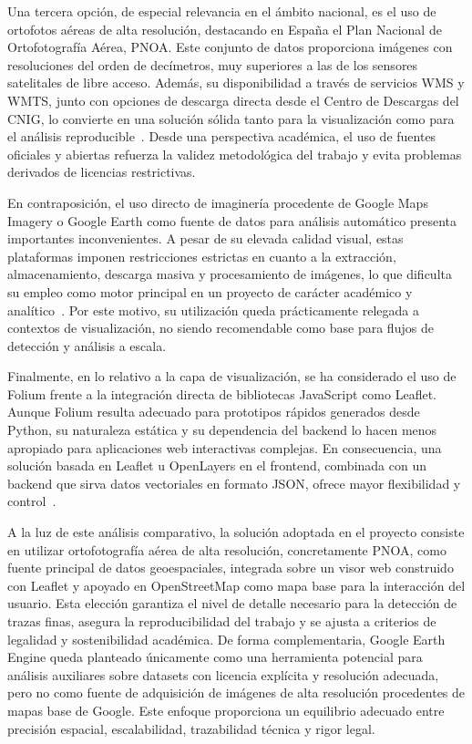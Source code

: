 Una tercera opción, de especial relevancia en el ámbito nacional, es el uso de ortofotos aéreas de alta resolución, destacando en España el Plan Nacional de Ortofotografía Aérea, PNOA. Este conjunto de datos proporciona imágenes con resoluciones del orden de decímetros, muy superiores a las de los sensores satelitales de libre acceso. Además, su disponibilidad a través de servicios WMS y WMTS, junto con opciones de descarga directa desde el Centro de Descargas del CNIG, lo convierte en una solución sólida tanto para la visualización como para el análisis reproducible~\cite{pnoa_ign, cnig_pnoa_maxima_actualidad}. Desde una perspectiva académica, el uso de fuentes oficiales y abiertas refuerza la validez metodológica del trabajo y evita problemas derivados de licencias restrictivas.

En contraposición, el uso directo de imaginería procedente de Google Maps Imagery o Google Earth como fuente de datos para análisis automático presenta importantes inconvenientes. A pesar de su elevada calidad visual, estas plataformas imponen restricciones estrictas en cuanto a la extracción, almacenamiento, descarga masiva y procesamiento de imágenes, lo que dificulta su empleo como motor principal en un proyecto de carácter académico y analítico~\cite{googlemaps_platform_terms}. Por este motivo, su utilización queda prácticamente relegada a contextos de visualización, no siendo recomendable como base para flujos de detección y análisis a escala.

Finalmente, en lo relativo a la capa de visualización, se ha considerado el uso de Folium frente a la integración directa de bibliotecas JavaScript como Leaflet. Aunque Folium resulta adecuado para prototipos rápidos generados desde Python, su naturaleza estática y su dependencia del backend lo hacen menos apropiado para aplicaciones web interactivas complejas. En consecuencia, una solución basada en Leaflet u OpenLayers en el frontend, combinada con un backend que sirva datos vectoriales en formato JSON, ofrece mayor flexibilidad y control~\cite{leaflet_web, osm_web}.

A la luz de este análisis comparativo, la solución adoptada en el proyecto consiste en utilizar ortofotografía aérea de alta resolución, concretamente PNOA, como fuente principal de datos geoespaciales, integrada sobre un visor web construido con Leaflet y apoyado en OpenStreetMap como mapa base para la interacción del usuario. Esta elección garantiza el nivel de detalle necesario para la detección de trazas finas, asegura la reproducibilidad del trabajo y se ajusta a criterios de legalidad y sostenibilidad académica. De forma complementaria, Google Earth Engine queda planteado únicamente como una herramienta potencial para análisis auxiliares sobre datasets con licencia explícita y resolución adecuada, pero no como fuente de adquisición de imágenes de alta resolución procedentes de mapas base de Google. Este enfoque proporciona un equilibrio adecuado entre precisión espacial, escalabilidad, trazabilidad técnica y rigor legal.

